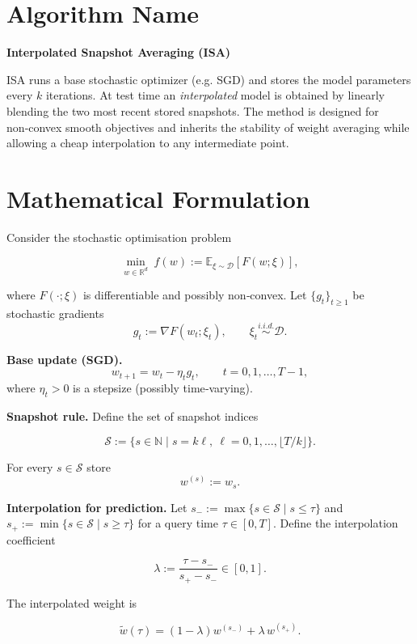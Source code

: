 \documentclass{article}
\begin{document}
\section*{Algorithm Name}
\textbf{Interpolated Snapshot Averaging (ISA)}  

ISA runs a base stochastic optimizer (e.g. SGD) and stores the model
parameters every $k$ iterations.  At test time an \emph{interpolated}
model is obtained by linearly blending the two most recent stored
snapshots.  The method is designed for non‑convex smooth objectives and
inherits the stability of weight averaging while allowing a cheap
interpolation to any intermediate point.

\section*{Mathematical Formulation}
Consider the stochastic optimisation problem  

\[
\min_{w\in\mathbb{R}^{d}} \; f(w):=\mathbb{E}_{\xi\sim\mathcal{D}}[F(w;\xi)] ,
\]

where $F(\cdot;\xi)$ is differentiable and possibly non‑convex.
Let $\{g_t\}_{t\ge 1}$ be stochastic gradients
\[
g_t:=\nabla F(w_t;\xi_t),\qquad \xi_t\stackrel{i.i.d.}{\sim}\mathcal{D}.
\]

\medskip
\noindent\textbf{Base update (SGD).}  
\[
\boxed{w_{t+1}=w_t-\eta_t g_t},\qquad t=0,1,\dots,T-1,
\tag{1}
\]
where $\eta_t>0$ is a stepsize (possibly time‑varying).

\medskip
\noindent\textbf{Snapshot rule.}  
Define the set of snapshot indices  

\[
\mathcal{S}:=\{s\in\mathbb{N}\;|\; s=k\ell,\ \ell=0,1,\dots,\lfloor T/k\rfloor\}.
\]

For every $s\in\mathcal{S}$ store  
\[
\boxed{w^{(s)}:=w_{s}} .
\tag{2}
\]

\medskip
\noindent\textbf{Interpolation for prediction.}  
Let $s_{-}:=\max\{s\in\mathcal{S}\;|\;s\le \tau\}$ and
$s_{+}:=\min\{s\in\mathcal{S}\;|\;s\ge \tau\}$ for a query time
$\tau\in[0,T]$.
Define the interpolation coefficient  

\[
\lambda:=\frac{\tau-s_{-}}{s_{+}-s_{-}}\in[0,1].
\]

The interpolated weight is  

\[
\boxed{\tilde w(\tau)= (1-\lambda) w^{(s_{-})}+ \lambda\, w^{(s_{+})}} .
\tag{3}
\]
\end{document}
